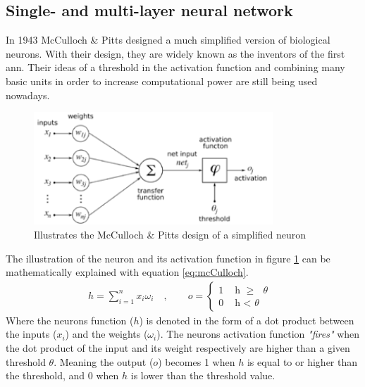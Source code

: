 \documentclass[USenglish]{ifimaster}  %
\begin{document}
\subsection{Single- and multi-layer neural network}
In 1943 McCulloch \& Pitts designed a much simplified version of biological neurons\cite{mcculloch_pitts}. With their design, they are widely known as the inventors of the first \ac{ann}. Their ideas of a threshold in the activation function and combining many basic units in order to increase computational power are still being used nowadays.
\begin{figure}[ht]
    \centering
    \includegraphics[width=0.8\textwidth]{bilder/mcculloch_and_pitts.png}
    \caption{Illustrates the McCulloch \& Pitts design of a simplified neuron \cite{website:mcCulloch_img}}
    \label{fig:mcculoch_and_pitts}
\end{figure}
The illustration of the neuron and its activation function in figure \ref{fig:mcculoch_and_pitts} can be mathematically explained with equation \ref{eq:mcCulloch}.
\begin{equation}\label{eq:mcCulloch}
\begin{aligned}
    {h = \sum_{i=1}^{n} x_i \omega_i \quad , \quad\quad o = 
\begin{cases}
    1 & \text{ h $\geq$ $\theta$ }  \\
    0 & \text{ h < $\theta$ }
\end{cases}}
\end{aligned}
\end{equation}
Where the neurons function ($h$) is denoted in the form of a dot product between the inputs ($x_i$) and the weights ($\omega_i$). The neurons activation function \textit{"fires"} when the dot product of the input and its weight respectively are higher than a given threshold $\theta$. Meaning the output ($o$) becomes 1 when $h$ is equal to or higher than the threshold, and 0 when $h$ is lower than the threshold value.
\newline
\newline
\end{document}
